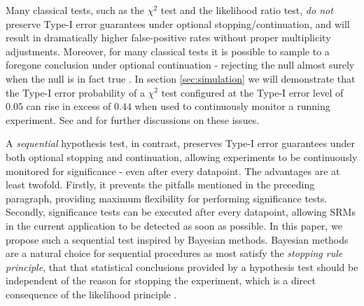 \documentclass[11pt]{article}
\begin{document}
Many classical tests, such as the $\chi^2$ test and the likelihood ratio test, \textit{do not} preserve Type-I error guarantees under optional stopping/continuation,
and will result in dramatically higher false-positive rates without proper multiplicity adjustments.
Moreover, for many classical tests it is possible to sample to a foregone conclusion under optional continuation - rejecting the null almost surely when the null is in fact true \cite{anscombe}.
In section \ref{sec:simulation} we will demonstrate that the Type-I error probability of a $\chi^2$ test configured at the Type-I error level of $0.05$ can rise in excess of $0.44$ when used to continuously monitor a running experiment.
See \cite{psychological} and \cite{safe} for further discussions on these issues.

A \textit{sequential} hypothesis test, in contrast, preserves Type-I error guarantees under both optional stopping and continuation, allowing experiments to be continuously monitored for significance - even after every datapoint.
The advantages are at least twofold. Firstly, it prevents the pitfalls mentioned in the preceding paragraph, providing maximum flexibility for performing significance tests.
Secondly, significance tests can be executed after every datapoint, allowing SRMs in the current application to be detected as soon as possible.
In this paper, we propose such a sequential test inspired by Bayesian methods.
Bayesian methods are a natural choice for sequential procedures as most satisfy the \textit{stopping rule principle}, that that statistical conclusions provided by a hypothesis test should be independent of the reason for stopping the experiment, which is a direct consequence of the likelihood principle \citep{likelihood}.
\end{document}
